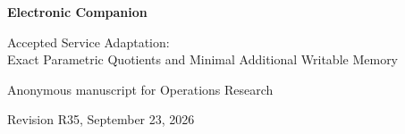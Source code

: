 \documentclass[11pt,letterpaper]{article}
\theoremstyle{definition}\newtheorem{assumption}[theorem]{Assumption}
\begin{document}
\begin{center}{\Large\bfseries Electronic Companion}\par\medskip
{\large Accepted Service Adaptation:\\ Exact Parametric Quotients and Minimal Additional Writable Memory}\par\medskip
Anonymous manuscript for Operations Research\par
Revision R35, September 23, 2026
\end{center}










\end{document}
